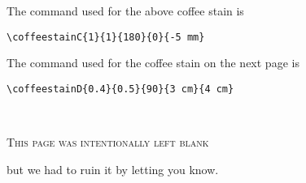 \documentclass[a4paper, 11pt, BCOR = 0 pt, oneside, english]{scrartcl}
\begin{document}
\begin{tcolorbox}
  The command used for the above coffee stain is

  \verb|\coffeestainC{1}{1}{180}{0}{-5 mm}|
\end{tcolorbox}

\begin{tcolorbox}
  The command used for the coffee stain on the next page is

  \verb|\coffeestainD{0.4}{0.5}{90}{3 cm}{4 cm}|
\end{tcolorbox}

\newpage{}
\pagestyle{empty}
~\\

\label{stainD}

\vfill{}
\begin{center}
\textsc{This page was intentionally left blank}

but we had to ruin it by letting you know.
\end{center}

\vfill{}
\end{document}
